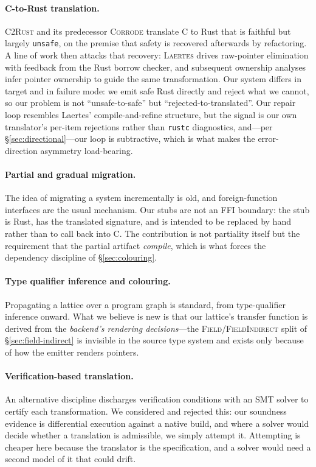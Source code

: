 \documentclass[10pt,twocolumn]{article}
\begin{document}
\paragraph{C-to-Rust translation.} \textsc{C2Rust} and its predecessor
\textsc{Corrode} translate C to Rust that is faithful but largely
\texttt{unsafe}, on the premise that safety is recovered afterwards by
refactoring. A line of work then attacks that recovery: \textsc{Laertes} drives
raw-pointer elimination with feedback from the Rust borrow checker, and
subsequent ownership analyses infer pointer ownership to guide the same
transformation. Our system differs in target and in failure mode: we emit safe
Rust directly and reject what we cannot, so our problem is not
``unsafe-to-safe'' but ``rejected-to-translated''. Our repair loop resembles
Laertes' compile-and-refine structure, but the signal is our own translator's
per-item rejections rather than \texttt{rustc} diagnostics, and---per
\S\ref{sec:directional}---our loop is subtractive, which is what makes the
error-direction asymmetry load-bearing.

\paragraph{Partial and gradual migration.} The idea of migrating a system
incrementally is old, and foreign-function interfaces are the usual mechanism.
Our stubs are not an FFI boundary: the stub is Rust, has the translated
signature, and is intended to be replaced by hand rather than to call back
into C. The contribution is not partiality itself but the requirement that the
partial artifact \emph{compile}, which is what forces the dependency
discipline of \S\ref{sec:colouring}.

\paragraph{Type qualifier inference and colouring.} Propagating a lattice over
a program graph is standard, from type-qualifier inference onward. What we
believe is new is that our lattice's transfer function is derived from the
\emph{backend's rendering decisions}---the \textsc{Field}/\textsc{FieldIndirect}
split of \S\ref{sec:field-indirect} is invisible in the source type system and
exists only because of how the emitter renders pointers.

\paragraph{Verification-based translation.} An alternative discipline
discharges verification conditions with an SMT solver to certify each
transformation. We considered and rejected this: our soundness evidence is
differential execution against a native build, and where a solver would decide
whether a translation is admissible, we simply attempt it. Attempting is
cheaper here because the translator is the specification, and a solver would
need a second model of it that could drift.
\end{document}
